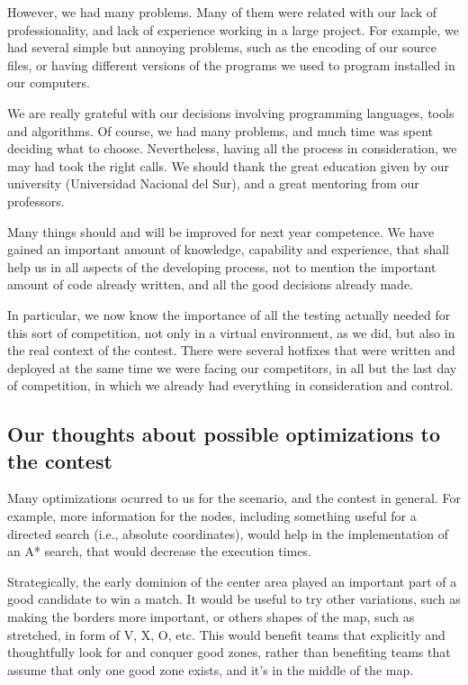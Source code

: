 \documentclass{llncs2e/llncs}
\begin{document}
    However, we had many problems. Many of them were related with our lack of 
    professionality, and lack of experience working in a large project. 
    For example, we had several simple but annoying problems, such as the 
    encoding of our source files, or having different versions of the programs 
    we used to program installed in our computers.

    We are really grateful with our decisions involving programming languages, 
    tools and algorithms. Of course, we had many problems, and much time was spent 
    deciding what to choose. Nevertheless, having all the process in 
    consideration, we may had took the right calls. We should thank the great 
    education given by our university (Universidad Nacional del Sur), and a 
    great mentoring from our professors.

    Many things should and will be improved for next year competence. We have
    gained an important amount of knowledge, capability and experience, that shall 
    help us in all aspects of the developing process, not to mention the 
    important amount of code already written, and all the good decisions already 
    made.

    In particular, we now know the importance of all the testing actually needed 
    for this sort of competition, not only in a virtual environment, as we did, 
    but also in the real context of the contest. There were several hotfixes that 
    were written and deployed at the same time we were facing our competitors, in 
    all but the last day of competition, in which we already had everything in 
    consideration and control.


\subsection{Our thoughts about possible optimizations to the contest}
    

    Many optimizations ocurred to us for the scenario, and the contest in general. 
    For example, more information for the nodes, including something useful for a 
    directed search (i.e., absolute coordinates), would help in the implementation 
    of an A* search, that would decrease the execution times.

    Strategically, the early dominion of the center area played an important part 
    of a good candidate to win a match. It would be useful to try other 
    variations, such as making the borders more important, or others shapes of the 
    map, such as stretched, in form of V, X, O, etc. This would benefit teams that 
    explicitly and thoughtfully look for and conquer good zones, rather than 
    benefiting teams that assume that only one good zone exists, and it's in the 
    middle of the map.
\end{document}
